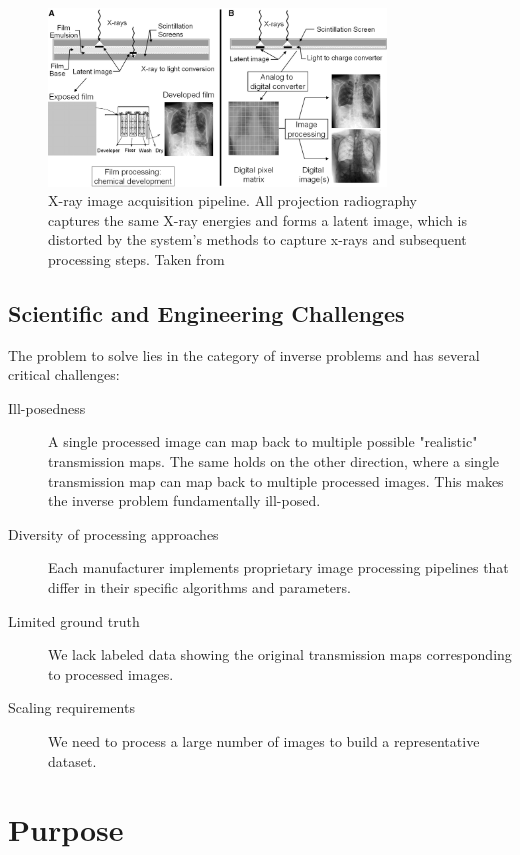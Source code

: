 \documentclass[nomenclature, english, bibtex]{kththesis}
\numberwithin{listing}{chapter}
\begin{document}
\begin{figure}
    \centering
    \includegraphics[width=0.8\textwidth]{figures/latent_image.jpg}
    \caption{X-ray image acquisition pipeline. All projection radiography captures the same X-ray energies and
   forms a latent image, which is distorted by the system's methods to capture x-rays and subsequent processing steps.
    Taken from \cite[p.~13]{Seibert3}}
    \label{fig:image_processing_pipeline}
\end{figure}

\subsection{Scientific and Engineering Challenges}

The problem to solve lies in the category of inverse problems and has several critical challenges:

\begin{description}
    \item[Ill-posedness]
        A single processed image can map back to multiple possible "realistic" transmission maps.
        The same holds on the other direction, where a single transmission map can map back to multiple processed images.
       This makes the inverse problem fundamentally ill-posed.
    \item[Diversity of processing approaches]
        Each manufacturer implements proprietary image processing pipelines that differ in their specific algorithms and parameters.
    \item[Limited ground truth] We lack labeled data showing the original transmission maps corresponding to processed images.
    \item[Scaling requirements] We need to process a large number of images to build a representative dataset.
\end{description}

\section{Purpose}
\end{document}
